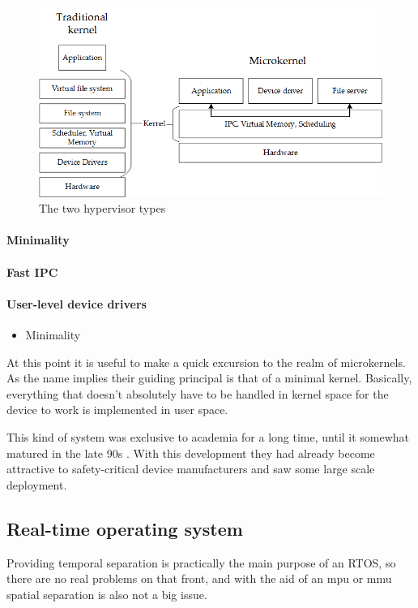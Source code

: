 \begin{figure}
\centering
\includegraphics[scale=0.75]{Figures/microkernel_vs_normal.png}
\decoRule
\caption{The two hypervisor types}
\label{fig:hypervisor_types}
\end{figure}

\paragraph{Minimality}
\paragraph{Fast IPC}
\paragraph{User-level device drivers}

\begin{itemize}
    \item Minimality
\end{itemize}

At this point it is useful to make a quick excursion to the realm of microkernels. As the name implies their guiding principal is that of a minimal kernel. Basically, everything that doesn't absolutely have to be handled in kernel space for the device to work is implemented in user space.

This kind of system was exclusive to academia for a long time, until it somewhat matured in the late 90s \cite{Liedtke.1995}\cite{Liedtke.1996}. With this development they had already become attractive to safety-critical device manufacturers and saw some large scale deployment.

\subsection{Real-time operating system}
Providing temporal separation is practically the main purpose of an RTOS, so there are no real problems on that front, and with the aid of an \acrshort{mpu} or \acrshort{mmu} spatial separation is also not a big issue.

